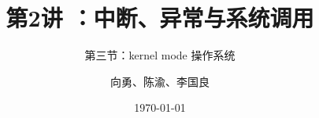 


\title[第2讲]{第2讲 ：中断、异常与系统调用 } %
\subtitle{第三节：kernel mode 操作系统}
\author{向勇、陈渝、李国良} %
\date{\today} %



\begin{frame}
\titlepage %
\end{frame}




